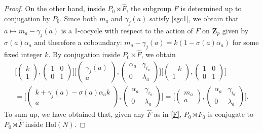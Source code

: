 \documentclass[10pt,a4paper]{amsart}
\newcommand{\Hol}{\mathrm{Hol}}
\newcommand{\Z}{\mathbf Z}
\begin{document}
\begin{proof}
On the other hand, inside $P_0\rtimes \hat F$, the subgroup $F$ is determined up to conjugation by $P_0$. Since both $m_a$ and $\gamma_j(a)$ satisfy \eqref{sgc1}, we obtain that $a\mapsto m_a-\gamma_j(a)$ is a 1-cocycle with respect to the action of $F$ on $\Z_p$ given by $\sigma(a)\alpha_a$ and therefore a coboundary:  $m_a-\gamma_j(a)=k(1-\sigma(a)\alpha_a)$ for some fixed integer $k$. By conjugation inside $P_0\rtimes \hat F$, we obtain
		$$\begin{array}{l}
		\Big[\begin{pmatrix}
		k\\
		1
		\end{pmatrix},\begin{pmatrix}
		1 & 0\\
		0&1
		\end{pmatrix}\Big]\Big[\begin{pmatrix}
		\gamma_j(a)\\
		a
		\end{pmatrix},\begin{pmatrix}
		\alpha_a & \gamma_{i_a}\\
		0&\lambda_a
		\end{pmatrix}\Big]
\Big[\begin{pmatrix}
		-k\\
		1
		\end{pmatrix},\begin{pmatrix}
		1 & 0\\
		0&1
		\end{pmatrix}\Big]\\[12pt]
=\Big[\begin{pmatrix}
		k+\gamma_j(a)-\sigma(a)\alpha_a k\\
		a
		\end{pmatrix},\begin{pmatrix}
	\alpha_a & \gamma_{i_a}\\
		0&\lambda_a
		\end{pmatrix}\Big]
=\Big[\begin{pmatrix}
		m_a\\
		a
		\end{pmatrix},\begin{pmatrix}
	\alpha_a & \gamma_{i_a}\\
		0&\lambda_a
		\end{pmatrix}\Big].
        \end{array}
		$$
To sum up, we have obtained that, given any $\hat F$ as in \eqref{F},  $P_0\rtimes F_0$ is conjugate to $P_0\rtimes \hat F$ inside $\Hol(N)$.


\end{proof}
\end{document}
